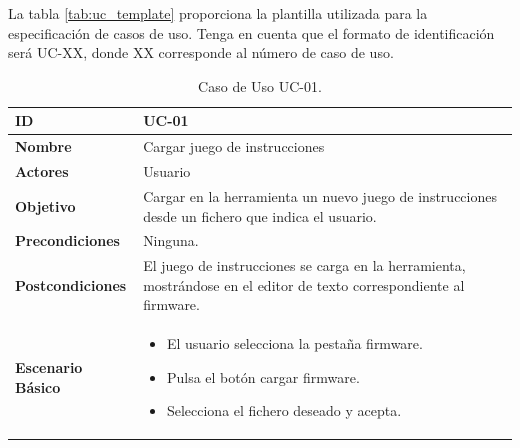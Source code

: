 La tabla \ref{tab:uc_template} proporciona la plantilla utilizada para la especificación de casos de uso. Tenga en cuenta que el formato de identificación será UC-XX, donde XX corresponde al número de caso de uso. 

\begin{center}
\begin{table}[htbp]
\centering
\begin{tabular}{@{}p{2.5cm} p{9cm}@{}} 
\toprule
\textbf{ID}	& UC-01  \\
\midrule
\textbf{Nombre} 		& Cargar juego de instrucciones   \\
\midrule
\textbf{Actores} 		&	Usuario  \\
\midrule
\textbf{Objetivo} 	&	Cargar en la herramienta un nuevo juego de instrucciones desde un fichero que indica el usuario. 	 \\
\midrule
\textbf{Precondiciones}	&	Ninguna.   \\
\midrule
\textbf{Postcondiciones} 	&	El juego de instrucciones se carga en la herramienta, mostrándose en el editor de texto correspondiente al firmware.   \\
\midrule
\textbf{Escenario Básico} 	&  \begin{itemize}
\item El usuario selecciona la pestaña firmware.
\item Pulsa el botón cargar firmware.
\item Selecciona el fichero deseado y acepta.
\end{itemize} \\
\bottomrule
\end{tabular}
\caption{Caso de Uso UC-01.}
\label{tab:uc01}
\end{table}
\end{center}


